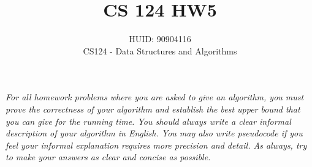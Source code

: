 \documentclass[11pt]{article}
\begin{document}
\title{CS 124 HW5}
\author{HUID: 90904116\\ %
CS124 - Data Structures and Algorithms} 
\maketitle



\textit{For all homework problems where you are asked to give an algorithm, you must prove the correctness of your algorithm and establish the best upper bound that you can give for the running time. You should always write a clear informal description of your algorithm in English. You may also write pseudocode if you feel your informal explanation requires more precision and detail. As always, try to make your answers as clear and concise as possible.}
\end{document}
